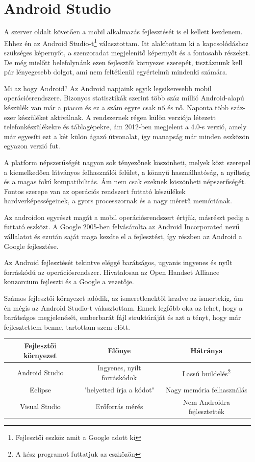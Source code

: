 \documentclass{thesis-ekf}
\theoremstyle{definition}
\theoremstyle{remark}
\begin{document}
\section{Android Studio}
A szerver oldalt követően a mobil alkalmazás fejlesztését is el kellett kezdenem. Ehhez én az Android Studio-t\footnote{Fejlesztői eszköz amit a Google adott ki} választottam. Itt alakítottam ki a kapcsolódáshoz szükséges képernyőt, a szenzoradat megjelenítő képernyőt és a fontosabb részeket. De még mielőtt belefolynánk ezen fejlesztői környezet szerepét, tisztáznunk kell pár lényegesebb dolgot, ami nem feltétlenül egyértelmű mindenki számára.
\par Mi az hogy Android? Az Android napjaink egyik legsikeresebb mobil  operációsrendszere. Bizonyos statisztikák szerint több száz millió Android-alapú készülék van már a piacon és ez a szám egyre csak nő és nő. Naponta több száz-ezer készüléket aktiválnak. A rendszernek régen külön verziója létezett telefonkészülékekre és táblagépekre, ám 2012-ben megjelent a 4.0-s verzió, amely már egyesíti ezt a két külön ágazó útvonalat, így manapság már minden eszközön egyazon verzió fut.
\par A platform népszerűségét nagyon sok tényezőnek köszönheti, melyek közt szerepel a kiemelkedően látványos felhasználói felület, a könnyű használhatóság, a nyíltság és a magas fokú kompatibilitás. Ám nem csak ezeknek köszönheti népszerűségét. Fontos szerepe van az operációs rendszert futtató készülékek hardverképességeinek, a gyors processzornak és a nagy méretű memóriának.
\par Az androidon egyrészt magát a mobil operációsrendszert értjük, másrészt pedig a futtató eszközt. A Google 2005-ben felvásárolta az Android Incorporated nevű vállalatot és ezután saját maga kezdte el a fejlesztést, így részben az Android a Google fejlesztése.
\par Az Android fejlesztését tekintve eléggé barátságos, ugyanis ingyenes és nyílt forráskódú az operációsrendszer. Hivatalosan az Open Handset Alliance konzorcium fejleszti és a Google a vezetője.
\par Számos fejlesztői környezet adódik, az ismeretlenektől kezdve az ismertekig, ám én mégis az Android Studio-t választottam. Ennek legfőbb oka az lehet, hogy a barátságos megjelenését, emberbarát fájl struktúráját és azt a tényt, hogy már fejlesztettem benne, tartottam szem előtt.
\begin{center}
	\begin{tabular}{ |c|c|c| } 
		\hline
		Fejlesztői környezet & Előnye & Hátránya \\
		\hline\hline
		Android Studio & Ingyenes, nyílt forráskódok & Lassú buildelés\footnote{A kész programot futtatjuk az eszközön}  \\
		\hline
		Eclipse & "helyetted írja a kódot" & Nagy memória felhasználás\\
		\hline
		Visual Studio & Erőforrás mérés & Nem Androidra fejlesztették \\
		\hline
	\end{tabular}
\end{center}
\end{document}
